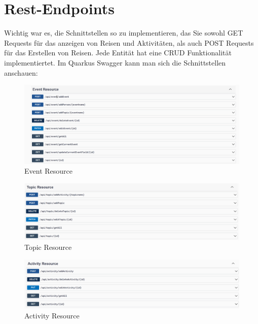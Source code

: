 \section{Rest-Endpoints}

Wichtig war es, die Schnittstellen so zu implementieren, das Sie sowohl GET Requests für das anzeigen von Reisen und Aktivitäten, als auch POST Requests für das Erstellen von Reisen.
Jede Entität hat eine CRUD Funktionalität implementiertet. Im Quarkus Swagger kann man sich die Schnittstellen anschauen:

\begin{figure}[h]
    \centering
    \includegraphics[scale=0.3]{pics/event_resource.png}
    \caption{Event Resource}
    \label{lst:event_resource}
\end{figure}

\begin{figure}[h]
    \centering
    \includegraphics[scale=0.3]{pics/topic_resource.png}
    \caption{Topic Resource}    
    \label{lst:topic_resource}
\end{figure}

\begin{figure}[h]
    \centering
    \includegraphics[scale=0.3]{pics/activity_resource.png}
    \caption{Activity Resource}
    \label{lst:activity_resource}
\end{figure}

